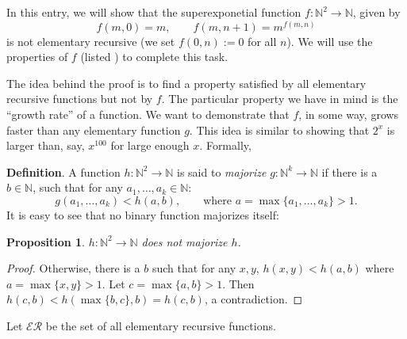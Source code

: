 \documentclass[12pt]{article}
\newtheorem{prop}{Proposition}
\begin{document}
In this entry, we will show that the superexponetial function $f:\mathbb{N}^2 \to \mathbb{N}$, given by $$f(m,0)=m,\qquad f(m,n+1)=m^{f(m,n)}$$
is not elementary recursive (we set $f(0,n):=0$ for all $n$).  We will use the properties of $f$ (listed ) to complete this task.

The idea behind the proof is to find a property satisfied by all elementary recursive functions but not by $f$.  The particular property we have in mind is the ``growth rate'' of a function.  We want to demonstrate that $f$, in some way, grows faster than any elementary function $g$.  This idea is similar to showing that $2^x$ is larger than, say, $x^{100}$ for large enough $x$.  Formally,

\textbf{Definition}.  A function $h:\mathbb{N}^2\to \mathbb{N}$ is said to \emph{majorize} $g:\mathbb{N}^k \to \mathbb{N}$ if there is a $b\in \mathbb{N}$, such that for any $a_1,\ldots, a_k \in \mathbb{N}$: $$g(a_1,\ldots, a_k) < h(a,b),\qquad \mbox{where }a=\max \lbrace a_1,\ldots, a_k \rbrace > 1.$$
It is easy to see that no binary function majorizes itself:
\begin{prop} $h:\mathbb{N}^2 \to \mathbb{N}$ does not majorize $h$. \end{prop}
\begin{proof}  Otherwise, there is a $b$ such that for any $x,y$, $h(x,y)< h(a, b)$ where $a=\max\lbrace x,y\rbrace>1$.  Let $c=\max \lbrace a,b\rbrace >1$.  Then $h(c,b)<h(\max \lbrace b,c\rbrace ,b)=h(c,b)$, a contradiction.
\end{proof}

Let $\mathcal{ER}$ be the set of all elementary recursive functions.
\end{document}
